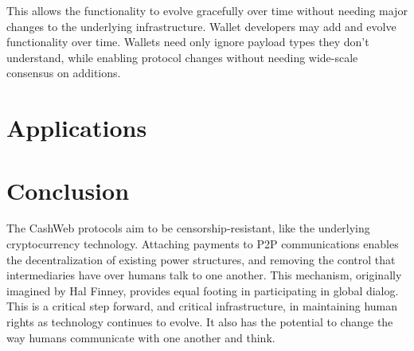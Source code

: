 \documentclass{article}
\theoremstyle{definition}
\begin{document}
This allows the functionality to evolve gracefully over time without needing major changes to the underlying infrastructure. Wallet developers may add and evolve functionality over time. Wallets need only ignore payload types they don't understand, while enabling protocol changes without needing wide-scale consensus on additions.

\section{Applications}

\section{Conclusion}

The CashWeb protocols aim to be censorship-resistant, like the underlying cryptocurrency technology. Attaching payments to P2P communications enables the decentralization of existing power structures, and removing the control that intermediaries have over humans talk to one another. This mechanism, originally imagined by Hal Finney\cite{finney2004rpow}, provides equal footing in participating in global dialog. This is a critical step forward, and critical infrastructure, in maintaining human rights as technology continues to evolve. It also has the potential to change the way humans communicate with one another and think.

\cite{nakamoto2008bpp}




\end{document}
